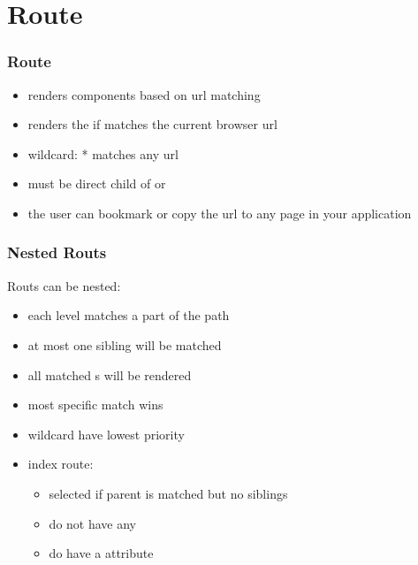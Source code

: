 \section{Route}
\begin{frame}[fragile] \frametitle{Route}
\begin{itemize}
  \item renders components based on url matching
  \item renders the  if  matches the current browser url
  \item wildcard: * matches any url
  \item {} must be direct child of  or 
  \item the user can bookmark or copy the url to any page in your application
\end{itemize}
\end{frame}

\begin{frame}[fragile] \frametitle{Nested Routs}
Routs can be nested:
\begin{itemize}
  \item each level matches a part of the path
  \item at most one sibling  will be matched
  \item all matched s will be rendered
  \item most specific match wins
  \item wildcard have lowest priority
  \item index route:\\ 
  \begin{itemize}
    \item selected if parent is matched but no siblings
    \item do not have any 
    \item do have a  attribute
  \end{itemize}
\end{itemize}
\end{frame}


